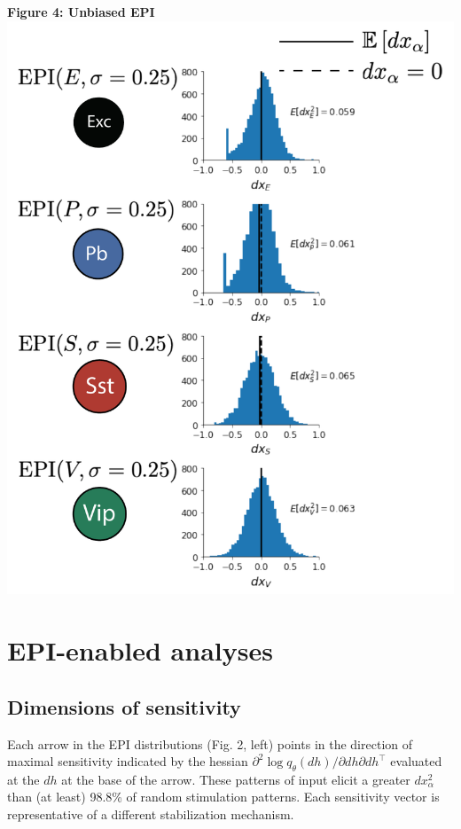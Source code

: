 \documentclass[11pt]{article}
\begin{document}
\begin{center}
\textbf{Figure 4: Unbiased EPI} \\
\includegraphics[scale=0.4]{figs/V1_EPI_Tx.pdf}
\end{center}

\section{EPI-enabled analyses}
\subsection{Dimensions of sensitivity}
Each arrow in the EPI distributions (Fig. 2, left) points in the direction of maximal sensitivity indicated by the hessian $\partial^2 \log q_\theta(dh) / \partial dh \partial dh^\top$ evaluated at the $dh$ at the base of the arrow.
These patterns of input elicit a greater $dx_\alpha^2$ than (at least) 98.8\% of random stimulation patterns.
Each sensitivity vector is representative of a different stabilization mechanism.
\end{document}

